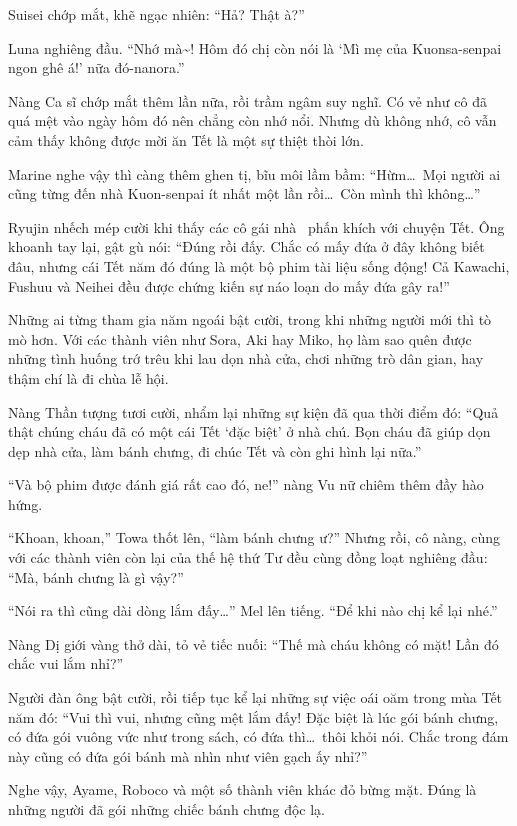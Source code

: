 \documentclass[../main.tex]{subfiles}
\begin{document}
Suisei chớp mắt, khẽ ngạc nhiên: ``Hả? Thật à?''

Luna nghiêng đầu. ``Nhớ mà\~{}! Hôm đó chị còn nói là `Mì mẹ của Kuonsa-senpai ngon ghê á!' nữa đó-nanora.''

Nàng Ca sĩ chớp mắt thêm lần nữa, rồi trầm ngâm suy nghĩ. Có vẻ như cô đã quá mệt vào ngày hôm đó nên chẳng còn nhớ nổi. Nhưng dù không nhớ, cô vẫn cảm thấy không được mời ăn Tết là một sự thiệt thòi lớn.

Marine nghe vậy thì càng thêm ghen tị, bĩu môi lầm bầm: ``Hừm\dots\ Mọi người ai cũng từng đến nhà Kuon-senpai ít nhất một lần rồi\dots\ Còn mình thì không\dots''

Ryujin nhếch mép cười khi thấy các cô gái nhà \hll\ phấn khích với chuyện Tết. Ông khoanh tay lại, gật gù nói: ``Đúng rồi đấy. Chắc có mấy đứa ở đây không biết đâu, nhưng cái Tết năm đó đúng là một bộ phim tài liệu sống động! Cả Kawachi, Fushuu và Neihei đều được chứng kiến sự náo loạn do mấy đứa gây ra!''

Những ai từng tham gia năm ngoái bật cười, trong khi những người mới thì tò mò hơn. Với các thành viên như Sora, Aki hay Miko, họ làm sao quên được những tình huống trớ trêu khi lau dọn nhà cửa, chơi những trò dân gian, hay thậm chí là đi chùa lễ hội.

Nàng Thần tượng tươi cười, nhẩm lại những sự kiện đã qua thời điểm đó: ``Quả thật chúng cháu đã có một cái Tết `đặc biệt' ở nhà chú. Bọn cháu đã giúp dọn dẹp nhà cửa, làm bánh chưng, đi chúc Tết và còn ghi hình lại nữa.''

``Và bộ phim được đánh giá rất cao đó, ne!'' nàng Vu nữ chiêm thêm đầy hào hứng.

``Khoan, khoan,'' Towa thốt lên, ``làm bánh chưng ư?'' Nhưng rồi, cô nàng, cùng với các thành viên còn lại của thế hệ thứ Tư đều cùng đồng loạt nghiêng đầu: ``Mà, bánh chưng là gì vậy?''

``Nói ra thì cũng dài dòng lắm đấy\dots'' Mel lên tiếng. ``Để khi nào chị kể lại nhé.''

Nàng Dị giới vàng thở dài, tỏ vẻ tiếc nuối: ``Thế mà cháu không có mặt! Lần đó chắc vui lắm nhỉ?''

Người đàn ông bật cười, rồi tiếp tục kể lại những sự việc oái oăm trong mùa Tết năm đó: ``Vui thì vui, nhưng cũng mệt lắm đấy! Đặc biệt là lúc gói bánh chưng, có đứa gói vuông vức như trong sách, có đứa thì\dots\ thôi khỏi nói. Chắc trong đám này cũng có đứa gói bánh mà nhìn như viên gạch ấy nhỉ?''

Nghe vậy, Ayame, Roboco và một số thành viên khác đỏ bừng mặt. Đúng là những người đã gói những chiếc bánh chưng độc lạ.
\end{document}
